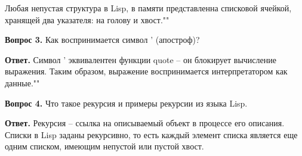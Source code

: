 \documentclass[12pt]{report}
\begin{document}
	Любая непустая структура в Lisp, в памяти представленна списковой ячейкой, хранящей два указателя: на голову и хвост.""\newline
	
	\textbf{Вопрос 3.} Как воспринимается символ ’ (апостроф)?
	
	\textbf{Ответ.} Символ ’ эквивалентен функции quote – он блокирует вычисление выражения. Таким образом, выражение воспринимается интерпретатором как данные.""\newline
	
	\textbf{Вопрос 4.} Что такое рекурсия и примеры рекурсии из языка Lisp.
	
	\textbf{Ответ.} Рекурсия – ссылка на описываемый объект в процессе его описания. Списки в Lisp заданы рекурсивно, то есть каждый элемент списка
	является еще одним списком, имеющим непустой или пустой хвост.
	
	
	
	
\end{document}
